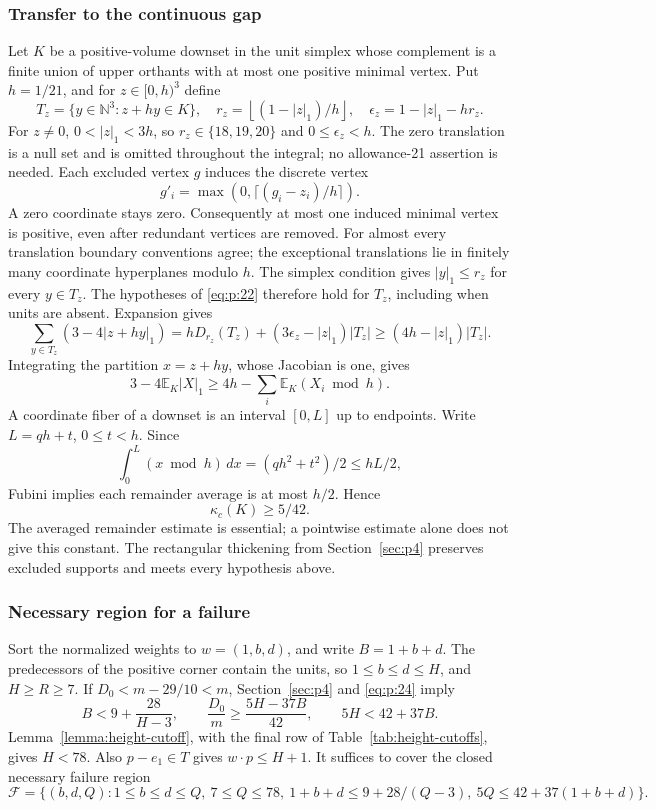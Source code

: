 \subsubsection{Transfer to the continuous gap}

Let \(K\) be a positive-volume downset in the unit simplex whose complement
is a finite union of upper orthants with at most one positive minimal vertex.
Put \(h=1/21\), and for \(z\in[0,h)^3\) define
\[
T_z=\{y\in\mathbb N^3:z+hy\in K\},\quad
r_z=\left\lfloor(1-|z|_1)/h\right\rfloor,\quad
\epsilon_z=1-|z|_1-hr_z.
\]
For \(z\ne0\), \(0<|z|_1<3h\), so
\(r_z\in\{18,19,20\}\) and \(0\le\epsilon_z<h\).
The zero translation is a null set and is omitted throughout the integral;
no allowance-21 assertion is needed.
Each excluded vertex \(g\) induces the discrete vertex
\[
g'_i=\max(0,\lceil(g_i-z_i)/h\rceil).
\]
A zero coordinate stays zero. Consequently at most one induced minimal
vertex is positive, even after redundant vertices are removed.
For almost every translation boundary conventions agree; the exceptional
translations lie in finitely many coordinate hyperplanes modulo \(h\).
The simplex condition gives \(|y|_1\le r_z\) for every \(y\in T_z\).
The hypotheses of \eqref{eq:p:22} therefore hold for \(T_z\), including when
units are absent. Expansion gives
\[
\sum_{y\in T_z}(3-4|z+hy|_1)
 =hD_{r_z}(T_z)+(3\epsilon_z-|z|_1)|T_z|
 \ge(4h-|z|_1)|T_z|.
\]
Integrating the partition \(x=z+hy\), whose Jacobian is one, gives
\[
3-4\mathbb E_K|X|_1
\ge4h-\sum_i\mathbb E_K(X_i\bmod h).
\]
A coordinate fiber of a downset is an interval \([0,L]\) up to endpoints.
Write \(L=qh+t\), \(0\le t<h\). Since
\[
\int_0^L(x\bmod h)\,dx=(qh^2+t^2)/2\le hL/2,
\]
Fubini implies each remainder average is at most \(h/2\). Hence
\begin{equation}
\boxed{\kappa_c(K)\ge5/42.}
\label{eq:p:24}
\end{equation}
The averaged remainder estimate is essential; a pointwise estimate alone
does not give this constant. The rectangular thickening from Section~\ref{sec:p4}
preserves excluded supports and meets every hypothesis above.

\subsubsection{Necessary region for a failure}

Sort the normalized weights to \(w=(1,b,d)\), and write \(B=1+b+d\).
The predecessors of the positive corner contain the units, so
\(1\le b\le d\le H\), and \(H\ge R\ge7\).
If \(D_0<m-29/10<m\), Section~\ref{sec:p4} and \eqref{eq:p:24} imply
\[
B<9+\frac{28}{H-3},\qquad
\frac{D_0}{m}\ge\frac{5H-37B}{42},\qquad 5H<42+37B.
\]
Lemma~\ref{lemma:height-cutoff}, with the final row of
Table~\ref{tab:height-cutoffs}, gives \(H<78\).
Also \(p-e_1\in T\) gives \(w\cdot p\le H+1\).
It suffices to cover the closed necessary failure region
\begin{equation}
\mathcal F=\{(b,d,Q):
1\le b\le d\le Q,\ 7\le Q\le78,\
1+b+d\le9+28/(Q-3),\
5Q\le42+37(1+b+d)\}.
\label{eq:p:25}
\end{equation}

